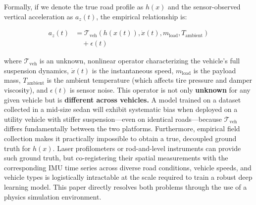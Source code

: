 \documentclass[conference]{IEEEtran}
\begin{document}
Formally, if we denote the true road profile as $h(x)$ and the sensor-observed vertical acceleration as $a_z(t)$, the empirical relationship is:

\begin{equation}
\begin{split}
a_z(t) &= \mathcal{T}_{\text{veh}}(h(x(t)), \dot{x}(t), m_{\text{load}}, T_{\text{ambient}}) \\
&\quad + \epsilon(t)
\end{split}
\end{equation}

where $\mathcal{T}_{\text{veh}}$ is an unknown, nonlinear operator characterizing the vehicle's full suspension dynamics, $\dot{x}(t)$ is the instantaneous speed, $m_{\text{load}}$ is the payload mass, $T_{\text{ambient}}$ is the ambient temperature (which affects tire pressure 
and damper viscosity), and $\epsilon(t)$ is sensor noise. This operator is not only \textbf{unknown} for any given vehicle but is \textbf{different across vehicles.} A model trained on a dataset collected in a mid-size sedan will exhibit systematic bias when deployed on a utility vehicle with stiffer suspension---even on identical roads---because $\mathcal{T}_{\text{veh}}$ differs fundamentally between the two platforms.
Furthermore, empirical field collection makes it practically impossible to obtain a true, decoupled ground truth for $h(x)$.
Laser profilometers or rod-and-level instruments can provide such ground truth, but co-registering their spatial measurements with the corresponding IMU time series across diverse road conditions, vehicle speeds, and vehicle types is logistically intractable at the scale required to train a robust deep learning model.
This paper directly resolves both problems through the use of a physics simulation environment.
\end{document}
